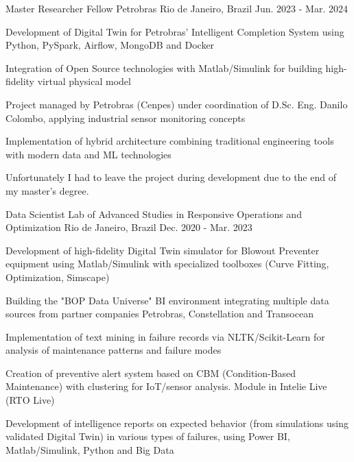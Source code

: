 \begin{cventries}
  \cventry
    {Master Researcher Fellow} %
    {Petrobras} %
    {Rio de Janeiro, Brazil} %
    {Jun. 2023 - Mar. 2024} %
    {
      \begin{cvitems} %
        \item {Development of Digital Twin for Petrobras' Intelligent Completion System using Python, PySpark, Airflow, MongoDB and Docker}
        \item {Integration of Open Source technologies with Matlab/Simulink for building high-fidelity virtual physical model}
        \item {Project managed by Petrobras (Cenpes) under coordination of D.Sc. Eng. Danilo Colombo, applying industrial sensor monitoring concepts}
        \item {Implementation of hybrid architecture combining traditional engineering tools with modern data and ML technologies}
        \item {Unfortunately I had to leave the project during development due to the end of my master's degree.}
      \end{cvitems}
    }

  \cventry
    {Data Scientist} %
    {Lab of Advanced Studies in Responsive Operations and Optimization} %
    {Rio de Janeiro, Brazil} %
    {Dec. 2020 - Mar. 2023} %
    {
      \begin{cvitems} %
        \item {Development of high-fidelity Digital Twin simulator for Blowout Preventer equipment using Matlab/Simulink with specialized toolboxes (Curve Fitting, Optimization, Simscape)}
        \item {Building the "BOP Data Universe" BI environment integrating multiple data sources from partner companies Petrobras, Constellation and Transocean}
        \item {Implementation of text mining in failure records via NLTK/Scikit-Learn for analysis of maintenance patterns and failure modes}
        \item {Creation of preventive alert system based on CBM (Condition-Based Maintenance) with clustering for IoT/sensor analysis. Module in Intelie Live (RTO Live)}
        \item {Development of intelligence reports on expected behavior (from simulations using validated Digital Twin) in various types of failures, using Power BI, Matlab/Simulink, Python and Big Data}
      \end{cvitems}
    }


\end{cventries}
